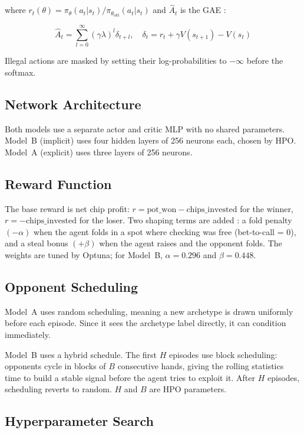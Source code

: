 \documentclass[11pt, conference]{IEEEtran}
\begin{document}
where $r_t(\theta) = \pi_\theta(a_t|s_t) / \pi_{\theta_\text{old}}
(a_t|s_t)$ and $\hat{A}_t$ is the GAE \cite{schulman2016high}:

\begin{equation}
\hat{A}_t = \sum_{l=0}^{\infty} (\gamma\lambda)^l \delta_{t+l},
\quad \delta_t = r_t + \gamma V(s_{t+1}) - V(s_t)
\label{eq:gae}
\end{equation}

Illegal actions are masked by setting their log-probabilities to
$-\infty$ before the softmax.

\subsection{Network Architecture}

Both models use a separate actor and critic MLP with no shared parameters.
Model~B (implicit) uses four hidden layers of 256 neurons each, chosen
by HPO. Model~A (explicit) uses three layers of 256 neurons.

\subsection{Reward Function}

The base reward is net chip profit: $r = \text{pot\_won} -
\text{chips\_invested}$ for the winner, $r = -\text{chips\_invested}$
for the loser. Two shaping terms are added \cite{ng1999policy}: a fold
penalty $(-\alpha)$ when the agent folds in a spot where checking was
free (bet-to-call = 0), and a steal bonus $(+\beta)$ when the agent
raises and the opponent folds. The weights are tuned by Optuna; for
Model~B, $\alpha = 0.296$ and $\beta = 0.448$.

\subsection{Opponent Scheduling}

Model~A uses random scheduling, meaning a new archetype is drawn uniformly before
each episode. Since it sees the archetype label directly, it can condition
immediately.

Model~B uses a hybrid schedule. The first $H$ episodes use block
scheduling: opponents cycle in blocks of $B$ consecutive hands, giving
the rolling statistics time to build a stable signal before the agent
tries to exploit it. After $H$ episodes, scheduling reverts to random.
$H$ and $B$ are HPO parameters.

\subsection{Hyperparameter Search}
\end{document}
